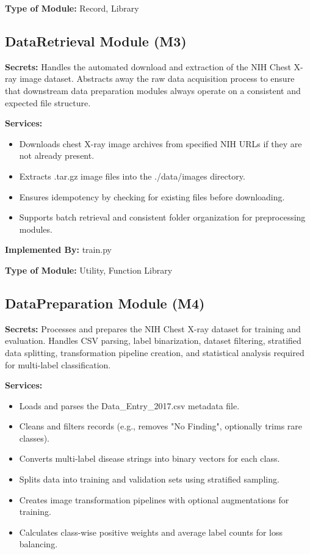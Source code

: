\documentclass[12pt, titlepage]{article}
\begin{document}
\textbf{Type of Module:} Record, Library

\subsection{DataRetrieval Module (M3)}

\textbf{Secrets:} Handles the automated download and extraction of the NIH Chest X-ray image dataset. Abstracts away the raw data acquisition process to ensure that downstream data preparation modules always operate on a consistent and expected file structure.

\textbf{Services:} 
\begin{itemize}
    \item Downloads chest X-ray image archives from specified NIH URLs if they are not already present.
    \item Extracts .tar.gz image files into the ./data/images directory.
    \item Ensures idempotency by checking for existing files before downloading.
    \item Supports batch retrieval and consistent folder organization for preprocessing modules.
\end{itemize}

\textbf{Implemented By:} train.py

\textbf{Type of Module:} Utility, Function Library

\subsection{DataPreparation Module (M4)}

\textbf{Secrets:} Processes and prepares the NIH Chest X-ray dataset for training and evaluation. Handles CSV parsing, label binarization, dataset filtering, stratified data splitting, transformation pipeline creation, and statistical analysis required for multi-label classification.

\textbf{Services:} 
\begin{itemize}
    \item Loads and parses the Data\_Entry\_2017.csv metadata file.
    \item Cleans and filters records (e.g., removes "No Finding", optionally trims rare classes).
    \item Converts multi-label disease strings into binary vectors for each class.
    \item Splits data into training and validation sets using stratified sampling.
    \item Creates image transformation pipelines with optional augmentations for training.
    \item Calculates class-wise positive weights and average label counts for loss balancing.
\end{itemize}
\end{document}
